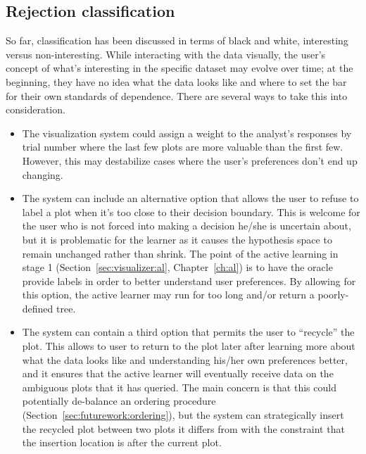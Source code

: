 \subsection{Rejection classification}
\label{sec:futurework:rejection}

So far, classification has been discussed in terms of black and white, 
interesting versus non-interesting. While interacting with the data visually, 
the user's concept of what's interesting in the specific dataset may evolve 
over time; at the beginning, they have no idea what the data looks like and 
where to set the bar for their own standards of dependence. There are several 
ways to take this into consideration. 

\tablespacing
\begin{itemize}
	\item The visualization system could assign a weight to the analyst's 
	responses by trial number where the last few plots are more valuable than 
	the first few. However, this may destabilize cases where the user's 
	preferences don’t end up changing.
	\item The system can include an alternative option that allows the user to 
	refuse to label a plot when it's too close to their decision boundary. This 
	is welcome for the user who is not forced into making a decision he/she is 
	uncertain about, but it is problematic for the learner as it causes the 
	hypothesis space to remain unchanged rather than shrink. The point of the 
	active learning in stage 1 (Section~\ref{sec:visualizer:al}, 
	Chapter~\ref{ch:al}) is to have the oracle provide labels in order to 
	better understand user preferences. By allowing for this option, the active
	learner may run for too long and/or return a poorly-defined tree. 
	\item The system can contain a third option that permits the user to 
	``recycle'' the plot. This allows to user to return to the plot later after 
	learning more about what the data looks like and understanding his/her own 
	preferences better, and it ensures that the active learner will eventually 
	receive data on the ambiguous plots that it has queried. The main concern 
	is that this could potentially de-balance an ordering procedure 
	(Section~\ref{sec:futurework:ordering}), but the system can strategically 
	insert the recycled plot between two plots it differs from with the 
	constraint that the insertion location is after the current plot.
\end{itemize}
\bodyspacing
